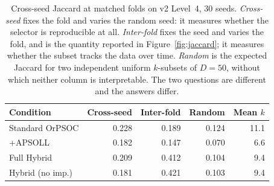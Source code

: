 \begin{table}[htbp]
    \centering
    \small
    \begin{tabular}{lrrrr}
    \hline
    Condition & Cross-seed & Inter-fold & Random & Mean $k$ \\
    \hline
    Standard OrPSOC & 0.228 & 0.189 & 0.124 & 11.1 \\
    +APSOLL & 0.182 & 0.147 & 0.070 & 6.6 \\
    Full Hybrid & 0.209 & 0.412 & 0.104 & 9.4 \\
    Hybrid (no imp.) & 0.181 & 0.421 & 0.103 & 9.4 \\
    \hline
    \end{tabular}
    \caption{Cross-seed Jaccard at matched folds on v2 Level~4, 30 seeds. \emph{Cross-seed} fixes the fold and varies the random seed: it measures whether the selector is reproducible at all. \emph{Inter-fold} fixes the seed and varies the fold, and is the quantity reported in Figure~\ref{fig:jaccard}; it measures whether the subset tracks the data over time. \emph{Random} is the expected Jaccard for two independent uniform $k$-subsets of $D = 50$, without which neither column is interpretable. The two questions are different and the answers differ.}
    \label{tab:crossseed}
\end{table}
